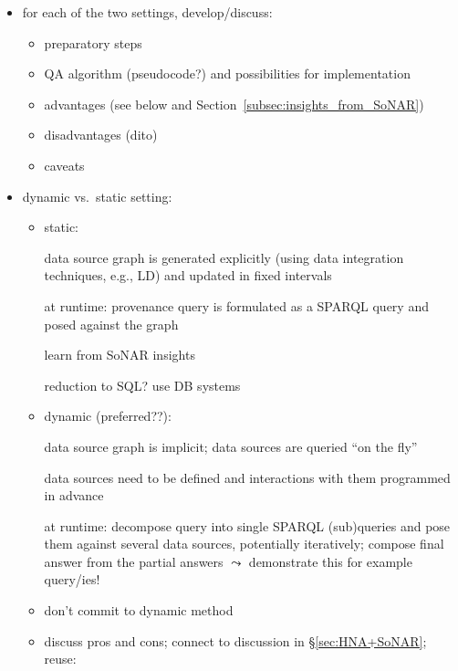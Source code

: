 \begin{itemize}
  \item
    for each of the two settings, develop/discuss:
    \begin{itemize}
      \item
        preparatory steps
      \item
        QA algorithm (pseudocode?) and possibilities for implementation
      \item
        advantages (see below and Section~\ref{subsec:insights_from_SoNAR})
      \item
        disadvantages (dito)
      \item
        caveats
    \end{itemize}
  \item
    dynamic vs.\ static setting:
    \begin{itemize}
      \item
        static: 
        
        data source graph is generated explicitly (using data integration techniques, e.g., LD)
        and updated in fixed intervals
                
        at runtime: provenance query is formulated as a \gls{SPARQL} query and posed against the graph
        
        learn from SoNAR insights
        
        reduction to SQL? use DB systems
      \item
        dynamic (preferred??):
        
        data source graph is implicit; data sources are queried \enquote{on the fly}
        
        data sources need to be defined and
        interactions with them programmed in advance
        
        at runtime: decompose query into single \gls{SPARQL} (sub)queries and pose them against several data sources,
        potentially iteratively;
        compose final answer from the partial answers
        $\leadsto$ demonstrate this for example query/ies!
      \item
        don't commit to dynamic method %
      \item
        discuss pros and cons; connect to discussion in §\ref{sec:HNA+SoNAR}; reuse:
        

\end{itemize}
\end{itemize}
